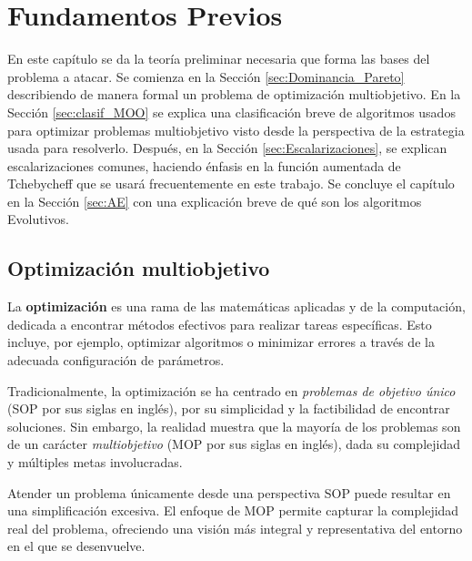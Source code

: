 

\chapter{Fundamentos Previos}

En este capítulo se da la teoría preliminar necesaria que forma las bases del problema a atacar. Se comienza en la Sección \ref{sec:Dominancia_Pareto} describiendo de manera formal un problema de optimización multiobjetivo. En la Sección \ref{sec:clasif_MOO} se explica una clasificación breve de algoritmos usados para optimizar problemas multiobjetivo visto desde la perspectiva de la estrategia usada para resolverlo. Después, en la Sección \ref{sec:Escalarizaciones}, se explican escalarizaciones comunes, haciendo énfasis en la función aumentada de Tchebycheff que se usará frecuentemente en este trabajo. 
Se concluye el capítulo en la Sección \ref{sec:AE} con una explicación breve de qué son los algoritmos Evolutivos.



\section{Optimización multiobjetivo} \label{sec:MOO}



La \textbf{optimización} es una rama de las matemáticas aplicadas y de la computación, dedicada a encontrar métodos efectivos para realizar tareas específicas. Esto incluye, por ejemplo, optimizar algoritmos o minimizar errores a través de la adecuada configuración de parámetros.

Tradicionalmente, la optimización se ha centrado en \textit{problemas de objetivo único} (SOP por sus siglas en inglés), por su simplicidad y la factibilidad de encontrar soluciones. Sin embargo, la realidad muestra que la mayoría de los problemas son de un carácter \textit{multiobjetivo} (MOP por sus siglas en inglés), dada su complejidad y múltiples metas involucradas.

Atender un problema únicamente desde una perspectiva SOP puede resultar en una simplificación excesiva. El enfoque de MOP permite capturar la complejidad real del problema, ofreciendo una visión más integral y representativa del entorno en el que se desenvuelve.

